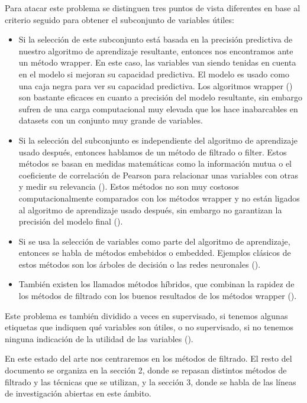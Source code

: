 \documentclass[a4paper,11pt]{article}
\begin{document}
Para atacar este problema se distinguen tres puntos de vista diferentes en base al criterio seguido para obtener el subconjunto de variables útiles:

\begin{itemize}
 
\item Si la selección de este subconjunto está basada en la precisión predictiva de nuestro algoritmo de aprendizaje resultante, entonces nos encontramos ante un método wrapper. En este caso, las variables van siendo tenidas en cuenta en el modelo si mejoran su capacidad predictiva. El modelo es usado como una caja negra para ver su capacidad predictiva. 
Los algoritmos wrapper (\cite{kohavi1997}) son bastante eficaces en cuanto a precisión del modelo resultante, sin embargo sufren de una carga computacional muy elevada que los hace inabarcables en datasets con un conjunto muy grande de variables.
\item Si la selección del subconjunto es independiente del algoritmo de aprendizaje usado después, entonces hablamos de un método de filtrado o filter. Estos métodos se basan en medidas matemáticas como la información mutua o el coeficiente de correlación de Pearson para relacionar unas variables con otras y medir su relevancia (\cite{gheyas2009}). Estos métodos no son muy costosos computacionalmente comparados con los métodos wrapper y no están ligados al algoritmo de aprendizaje usado después, sin embargo no garantizan la precisión del modelo final (\cite{fast}).
\item Si se usa la selección de variables como parte del algoritmo de aprendizaje, entonces se habla de métodos embebidos o embedded. Ejemplos clásicos de estos métodos son los árboles de decisión o las redes neuronales (\cite{breiman1984}).  
\item También existen los llamados métodos híbridos, que combinan la rapidez de los métodos de filtrado con los buenos resultados de los métodos wrapper (\cite{uncu2007}).
\end{itemize} 

Este problema es también dividido a veces en supervisado, si tenemos algunas etiquetas que indiquen qué variables son útiles, o no supervisado, si no tenemos ninguna indicación de la utilidad de las variables (\cite{li2014}).

En este estado del arte nos centraremos en los métodos de filtrado. El resto del documento se organiza en la sección 2, donde se repasan distintos métodos de filtrado y las técnicas que se utilizan, y la sección 3, donde se habla de las líneas de investigación abiertas en este ámbito.
\end{document}
